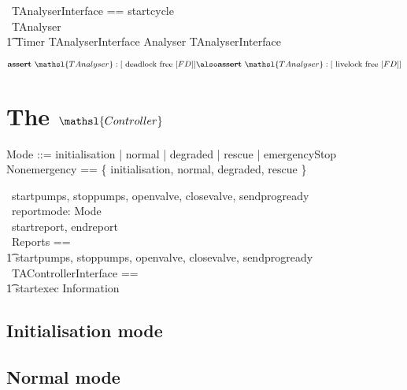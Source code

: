 \documentclass{report} %
\begin{document}
\begin{circus}
    \circchannelset\ TAnalyserInterface == \lchanset startcycle \rchanset \\
    \circprocess\ TAnalyser \circdef \\
        \t1 Timer \lpar TAnalyserInterface \rpar Analyser \circhide TAnalyserInterface
\end{circus}


\[
  \mathbf{assert}\ \mathsl{TAnalyser} :[ \hbox{ deadlock free } [FD] ] %
  \also %
  \mathbf{assert}\ \mathsl{TAnalyser} :[ \hbox{ livelock free } [FD] ]
\]

\chapter{The $\mathsl{Controller}$}

\begin{zed}
  Mode ::= initialisation | normal | degraded | rescue | emergencyStop \\
  Nonemergency == \{ initialisation, normal, degraded, rescue \}
\end{zed}

\begin{circus}
    \circchannel\ startpumps, stoppumps, openvalve, closevalve, sendprogready \\
    \circchannel\ reportmode: Mode \\
    \circchannel\ startreport, endreport \\
    \circchannelset\ Reports == \\
        \t1 \lchanset startpumps, stoppumps, openvalve, closevalve, sendprogready \rchanset \\
    \circchannelset\ TAControllerInterface ==  \\
        \t1 \lchanset startexec \rchanset \cup Information
\end{circus}

\section{Initialisation mode}
\section{Normal mode}
\end{document}
